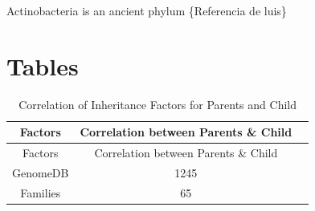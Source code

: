 \documentclass[12pt,twoside]{reedthesis}
\begin{document}
  Actinobacteria is an ancient phylum \{Referencia de luis\}
  
  \section{Tables}\label{tables-1}
  
  \begin{longtable}[]{@{}ccl@{}}
  \caption{Correlation of Inheritance Factors for Parents and Child
  \label{tab:inher}}\tabularnewline
  \toprule
  \begin{minipage}[b]{0.29\columnwidth}\centering\strut
  Factors\strut
  \end{minipage} & \begin{minipage}[b]{0.47\columnwidth}\centering\strut
  Correlation between Parents \& Child\strut
  \end{minipage} & \begin{minipage}[b]{0.16\columnwidth}\raggedright\strut
  \strut
  \end{minipage}\tabularnewline
  \midrule
  \endfirsthead
  \toprule
  \begin{minipage}[b]{0.29\columnwidth}\centering\strut
  Factors\strut
  \end{minipage} & \begin{minipage}[b]{0.47\columnwidth}\centering\strut
  Correlation between Parents \& Child\strut
  \end{minipage} & \begin{minipage}[b]{0.16\columnwidth}\raggedright\strut
  \strut
  \end{minipage}\tabularnewline
  \midrule
  \endhead
  \begin{minipage}[t]{0.29\columnwidth}\centering\strut
  GenomeDB\strut
  \end{minipage} & \begin{minipage}[t]{0.47\columnwidth}\centering\strut
  1245\strut
  \end{minipage} & \begin{minipage}[t]{0.16\columnwidth}\raggedright\strut
  \strut
  \end{minipage}\tabularnewline
  \begin{minipage}[t]{0.29\columnwidth}\centering\strut
  Families\strut
  \end{minipage} & \begin{minipage}[t]{0.47\columnwidth}\centering\strut
  65\strut
  \end{minipage} & \begin{minipage}[t]{0.16\columnwidth}\raggedright\strut
  \strut
  \end{minipage}\tabularnewline
  \bottomrule
  \end{longtable}
  
\end{document}
